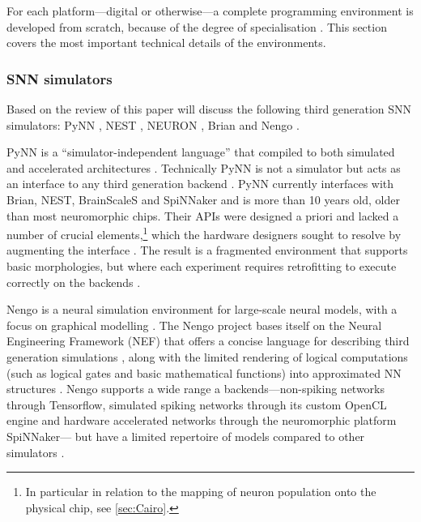 \documentclass[report.tex]{subfiles}
\begin{document}
For each platform---digital or otherwise---a complete programming environment
is developed from scratch, because of the degree of specialisation
\cite{Walter2015, Lin2018}.
This section covers the most important technical details of
the environments.

\subsubsection{\Gls{SNN} simulators} \label{sec:SNN-simulators}
Based on the review of \textcite{Blundell2018} this paper will discuss
the following third generation \gls{SNN} simulators: PyNN \cite{Davison2009},
NEST \cite{Gewaltig2007}, NEURON \cite{Carnevale2007},
Brian \cite{Goodman2013} and Nengo \cite{Eliasmith2015}.

PyNN is a ``simulator-independent language''
\cite{PyNN2018} that compiled to both simulated and
accelerated architectures \cite{Davison2009}.
Technically PyNN is not a simulator but acts as an interface to any third generation
backend \cite{Davison2009}.
PyNN currently interfaces with Brian, NEST, BrainScaleS and SpiNNaker
and is more than 10 years old, \cite{Davison2009} older
than most neuromorphic chips. 
Their \gls{API}s were designed a priori and lacked a number of crucial
elements,\footnote{In particular in relation to the mapping of neuron population
onto the physical chip, see \ref{sec:Cairo}.} which the hardware designers sought
to resolve by augmenting the interface \cite{Pfeil2013, PyNN2018}.
The result is a fragmented environment that supports basic morphologies, 
but where each experiment requires retrofitting to execute correctly on the 
backends \cite{PyNN2018}.

Nengo is a neural simulation environment for large-scale neural models, with
a focus on graphical modelling \cite{Eliasmith2015}. 
The Nengo project bases itself on the Neural Engineering Framework (NEF)
 that offers a concise language for
describing third generation simulations \cite{Bekolay2014}, along with
the limited rendering of logical computations (such as logical gates and basic
mathematical functions) into approximated
\gls{NN} structures \cite{Eliasmith2004, Eliasmith2015}.
Nengo supports a wide range a backends---non-spiking networks through Tensorflow,
simulated spiking networks through its custom \gls{OpenCL} engine and 
hardware accelerated networks through the neuromorphic platform SpiNNaker---
but have a limited repertoire of models compared to other simulators
\cite{Nengo2018}.
\end{document}
